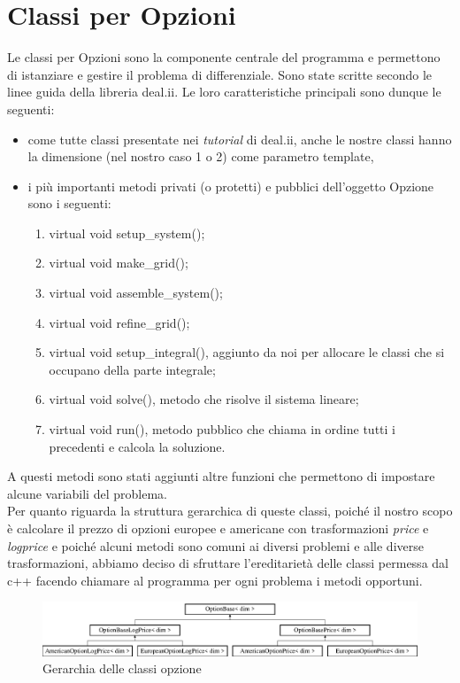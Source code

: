 \documentclass[a4paper,10pt]{report}
\theoremstyle{plain}
\theoremstyle{definition}
\theoremstyle{remark}
\begin{document}
\section{Classi per Opzioni}
Le classi per Opzioni sono la componente centrale del programma e permettono di istanziare e gestire il problema di differenziale. Sono state scritte secondo le linee guida della libreria \textsf{deal.ii}. Le loro caratteristiche principali sono dunque le seguenti:
\begin{itemize}
\item {come tutte classi presentate nei \emph{tutorial} di \textsf{deal.ii}, anche le nostre classi hanno la dimensione (nel nostro caso 1 o 2) come parametro \textsf{template},}
\item {i pi\`u importanti metodi privati (o protetti) e pubblici dell'oggetto Opzione sono i seguenti:}
\begin{enumerate}
\item \textsf{virtual void setup\_system()};
\item \textsf{virtual void make\_grid()};
\item \textsf{virtual void assemble\_system()};
\item \textsf{virtual void refine\_grid()};
\item \textsf{virtual void setup\_integral()}, aggiunto da noi per allocare le classi che si occupano della parte integrale;
\item \textsf{virtual void solve()}, metodo che risolve il sistema lineare;
\item \textsf{virtual void run()}, metodo pubblico che chiama in ordine tutti i precedenti e calcola la soluzione.
\end{enumerate}
\end{itemize}
A questi metodi sono stati aggiunti altre funzioni che permettono di impostare alcune variabili del problema.\\Per quanto riguarda la struttura gerarchica di queste classi, poich\'e il nostro scopo \`e calcolare il prezzo di opzioni europee e americane con trasformazioni \emph{price} e \emph{logprice} e poich\'e alcuni metodi sono comuni ai diversi problemi e alle diverse trasformazioni, abbiamo deciso di sfruttare l'ereditariet\`a delle classi permessa dal c++ facendo chiamare al programma per ogni problema i metodi opportuni.
\begin{figure}[h!]
\begin{center}
\includegraphics[width=12cm]{img/classOptionBase.eps}
\caption{Gerarchia delle classi opzione}
\end{center}
\label{optionbase}
\end{figure}
\end{document}
